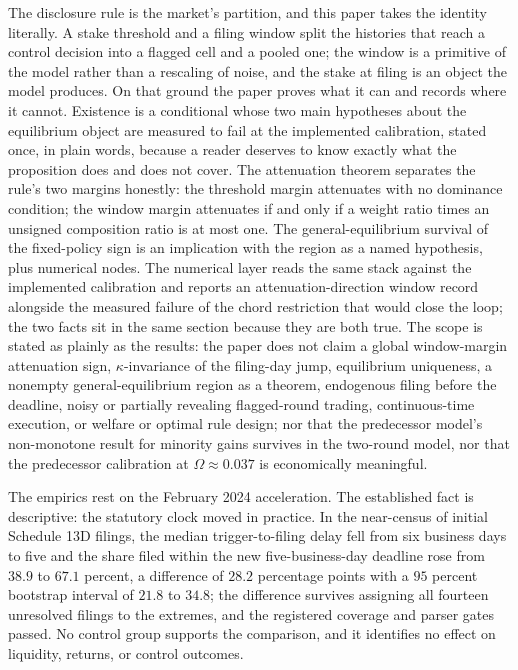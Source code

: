 \documentclass[11pt]{article}
\begin{document}
The disclosure rule is the market's partition, and this paper takes the identity literally. A stake
threshold and a filing window split the histories that reach a control decision into a flagged cell
and a pooled one; the window is a primitive of the model rather than a rescaling of noise, and the
stake at filing is an object the model produces. On that ground the paper proves what it can and
records where it cannot. Existence is a conditional whose two main hypotheses about the equilibrium
object are measured to fail at the implemented calibration, stated once, in plain words, because
a reader deserves to know exactly what the proposition does and does not cover. The attenuation
theorem separates the rule's two margins honestly: the threshold margin attenuates with no
dominance condition; the window margin attenuates if and only if a weight ratio times an unsigned
composition ratio is at most one. The general-equilibrium survival of the fixed-policy sign is an
implication with the region as a named hypothesis, plus numerical nodes. The numerical layer reads
the same stack against the implemented calibration and reports an attenuation-direction window
record alongside the measured failure of the chord restriction that would close the loop; the
two facts sit in the same section because they are both true. The scope is stated as plainly as
the results: the paper does not claim a global window-margin attenuation sign, $\kappa$-invariance
of the filing-day jump, equilibrium uniqueness, a nonempty general-equilibrium region as a
theorem, endogenous filing before the deadline, noisy or partially revealing flagged-round
trading, continuous-time execution, or welfare or optimal rule design; nor that the predecessor
model's non-monotone result for minority gains survives in the two-round model, nor that the
predecessor calibration at $\Omega \approx 0.037$ is economically meaningful.

The empirics rest on the February 2024 acceleration. The established fact is descriptive: the
statutory clock moved in practice. In the near-census of initial Schedule 13D filings, the
median trigger-to-filing delay fell from six business days to five and the share filed within
the new five-business-day deadline rose from $38.9$ to $67.1$ percent, a difference of $28.2$
percentage points with a $95$ percent bootstrap interval of $21.8$ to $34.8$; the difference
survives assigning all fourteen unresolved filings to the extremes, and the registered coverage
and parser gates passed. No control group supports the comparison, and it identifies no effect
on liquidity, returns, or control outcomes.
\end{document}
